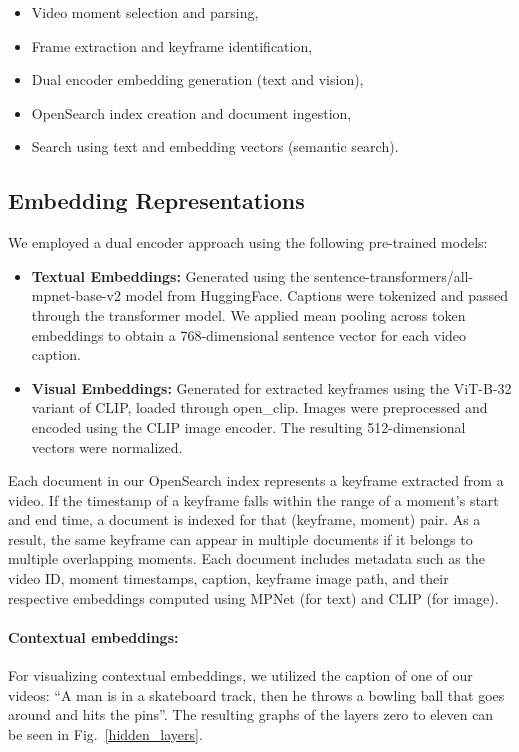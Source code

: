 \documentclass[runningheads]{llncs}
\begin{document}
\begin{itemize}
    \item Video moment selection and parsing,
    \item Frame extraction and keyframe identification,
    \item Dual encoder embedding generation (text and vision),
    \item OpenSearch index creation and document ingestion,
    \item Search using text and embedding vectors (semantic search).
\end{itemize}

\pagebreak[3]

\subsection{Embedding Representations}
We employed a dual encoder approach using the following pre-trained models:

\begin{itemize}
    \item \textbf{Textual Embeddings:} Generated using the sentence-transformers/all-mpnet-base-v2 model from HuggingFace. Captions were tokenized and passed through the transformer model. We applied mean pooling across token embeddings to obtain a 768-dimensional sentence vector for each video caption.
    \item \textbf{Visual Embeddings:} Generated for extracted keyframes using the ViT-B-32 variant of CLIP, loaded through open\_clip. Images were preprocessed and encoded using the CLIP image encoder. The resulting 512-dimensional vectors were normalized.
\end{itemize}

\begin{sloppypar}
Each document in our OpenSearch index represents a keyframe extracted from a video. If the timestamp of a keyframe falls within the range of a moment's start and end time, a document is indexed for that (keyframe, moment) pair. As a result, the same keyframe can appear in multiple documents if it belongs to multiple overlapping moments. Each document includes metadata such as the video ID, moment timestamps, caption, keyframe image path, and their respective embeddings computed using MPNet (for text) and CLIP (for image).
\end{sloppypar}

\paragraph{Contextual embeddings:}For visualizing contextual embeddings, we utilized the caption of one of our videos: 
``A man is in a skateboard track, then he throws a bowling ball that goes around and hits the pins''. 
The resulting graphs of the layers zero to eleven can be seen in Fig.~\ref{hidden_layers}.
\end{document}
